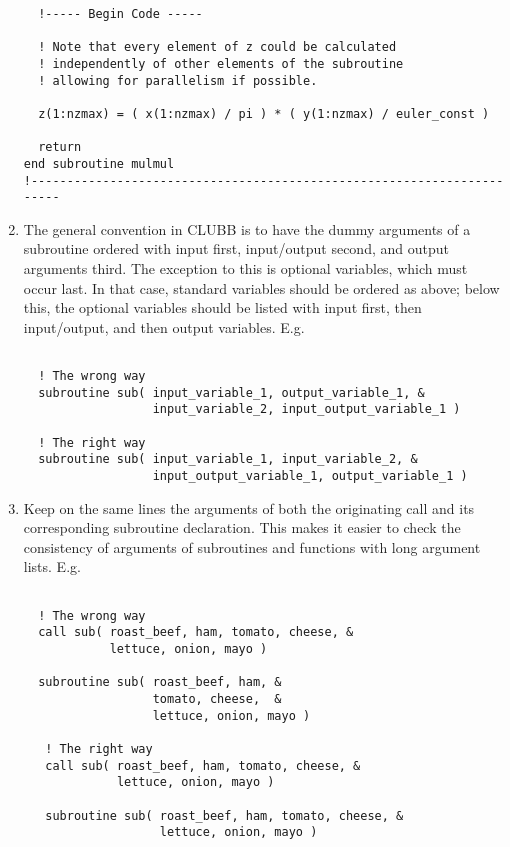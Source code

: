 \documentclass[letterpaper,12pt]{article}
\begin{document}
\begin{enumerate}
\begin{verbatim}
  !----- Begin Code -----

  ! Note that every element of z could be calculated 
  ! independently of other elements of the subroutine
  ! allowing for parallelism if possible.

  z(1:nzmax) = ( x(1:nzmax) / pi ) * ( y(1:nzmax) / euler_const )

  return
end subroutine mulmul
!-----------------------------------------------------------------------
\end{verbatim}

\item The general convention in CLUBB is to have the dummy arguments of a subroutine 
ordered with input first, input/output second, and output arguments third. 
The exception to this is optional variables, which must occur last.  In that case,
standard variables should be ordered as above; below this, the optional variables should
be listed with input first, then input/output, and then output variables.
\newline
E.g.
\begin{verbatim}

  ! The wrong way
  subroutine sub( input_variable_1, output_variable_1, &
                  input_variable_2, input_output_variable_1 )

  ! The right way
  subroutine sub( input_variable_1, input_variable_2, &
                  input_output_variable_1, output_variable_1 )

\end{verbatim}

\item Keep on the same lines the arguments of both the originating call and its 
corresponding subroutine declaration.  This makes it easier to check the 
consistency of arguments of subroutines and functions with long argument lists.
\newline 
E.g.
\begin{verbatim}

  ! The wrong way
  call sub( roast_beef, ham, tomato, cheese, &
            lettuce, onion, mayo )

  subroutine sub( roast_beef, ham, &
                  tomato, cheese,  &
                  lettuce, onion, mayo )

   ! The right way
   call sub( roast_beef, ham, tomato, cheese, &
             lettuce, onion, mayo )

   subroutine sub( roast_beef, ham, tomato, cheese, &
                   lettuce, onion, mayo )


\end{verbatim}
\end{enumerate}
\end{document}
